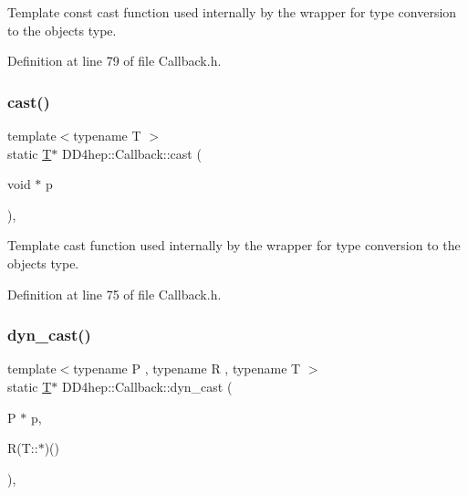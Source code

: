 Template const cast function used internally by the wrapper for type conversion to the object\textquotesingle{}s type. 



Definition at line 79 of file Callback.\+h.

\hypertarget{class_d_d4hep_1_1_callback_a36c5bf29bb29ea51f37f27ae292d40c6}{}\label{class_d_d4hep_1_1_callback_a36c5bf29bb29ea51f37f27ae292d40c6} 
\subsubsection{\texorpdfstring{cast()}{cast()}}
{\footnotesize\ttfamily template$<$typename T $>$ \\
static \hyperlink{class_t}{T}$\ast$ D\+D4hep\+::\+Callback\+::cast (\begin{DoxyParamCaption}\item[{void $\ast$}]{p }\end{DoxyParamCaption})\hspace{0.3cm}{\ttfamily [inline]}, {\ttfamily [static]}}



Template cast function used internally by the wrapper for type conversion to the object\textquotesingle{}s type. 



Definition at line 75 of file Callback.\+h.

\hypertarget{class_d_d4hep_1_1_callback_a43c24c6deb1eb616f4e21d6653ac2162}{}\label{class_d_d4hep_1_1_callback_a43c24c6deb1eb616f4e21d6653ac2162} 
\subsubsection{\texorpdfstring{dyn\+\_\+cast()}{dyn\_cast()}\hspace{0.1cm}{\footnotesize\ttfamily [1/4]}}
{\footnotesize\ttfamily template$<$typename P , typename R , typename T $>$ \\
static \hyperlink{class_t}{T}$\ast$ D\+D4hep\+::\+Callback\+::dyn\+\_\+cast (\begin{DoxyParamCaption}\item[{P $\ast$}]{p,  }\item[{R(T\+::$\ast$)()}]{ }\end{DoxyParamCaption})\hspace{0.3cm}{\ttfamily [inline]}, {\ttfamily [static]}}



